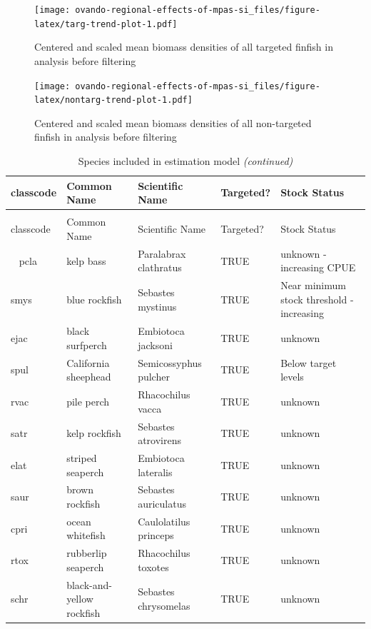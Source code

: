 \documentclass[]{article}
\begin{document}
\begin{figure}
\centering
\texttt{[image: ovando-regional-effects-of-mpas-si\_files/figure-latex/targ-trend-plot-1.pdf]}
\caption{\label{fig:targ-trend-plot}Centered and scaled mean biomass densities of all targeted finfish in analysis before filtering}
\end{figure}

\begin{figure}
\centering
\texttt{[image: ovando-regional-effects-of-mpas-si\_files/figure-latex/nontarg-trend-plot-1.pdf]}
\caption{\label{fig:nontarg-trend-plot}Centered and scaled mean biomass densities of all non-targeted finfish in analysis before filtering}
\end{figure}

\begin{longtable}[t]{lllll}
\caption{\label{tab:classcode}Species included in estimation model}\\
\toprule
classcode & Common Name & Scientific Name & Targeted? & Stock Status\\
\midrule
\endfirsthead
\caption[]{\label{tab:classcode}Species included in estimation model \textit{(continued)}}\\
\toprule
classcode & Common Name & Scientific Name & Targeted? & Stock Status\\
\midrule
\endhead
\
\endfoot
\bottomrule
\endlastfoot
pcla & kelp bass & Paralabrax clathratus & TRUE & unknown - increasing CPUE\\
smys & blue rockfish & Sebastes mystinus & TRUE & Near minimum stock threshold - increasing\\
ejac & black surfperch & Embiotoca jacksoni & TRUE & unknown\\
spul & California sheephead & Semicossyphus pulcher & TRUE & Below target levels\\
rvac & pile perch & Rhacochilus vacca & TRUE & unknown\\
\addlinespace
satr & kelp rockfish & Sebastes atrovirens & TRUE & unknown\\
elat & striped seaperch & Embiotoca lateralis & TRUE & unknown\\
saur & brown rockfish & Sebastes auriculatus & TRUE & unknown\\
cpri & ocean whitefish & Caulolatilus princeps & TRUE & unknown\\
rtox & rubberlip seaperch & Rhacochilus toxotes & TRUE & unknown\\
\addlinespace
schr & black-and-yellow rockfish & Sebastes chrysomelas & TRUE & unknown\\

\end{longtable}
\end{document}
